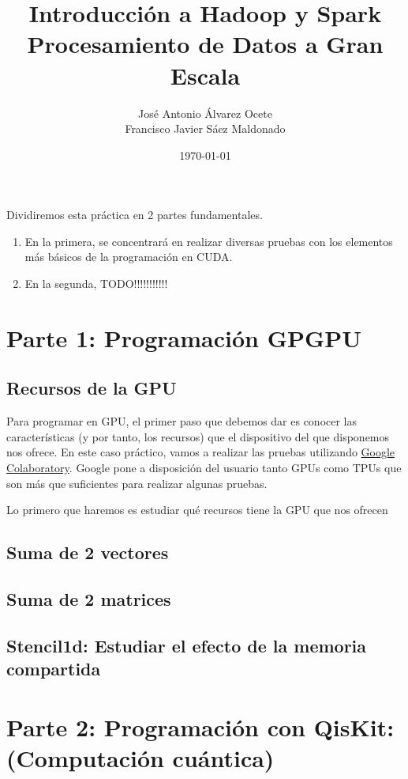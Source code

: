 \documentclass[11pt]{article}
\author{José Antonio Álvarez Ocete\\ Francisco Javier Sáez Maldonado}
\date{\today}
\title{Introducción a Hadoop y Spark\\\medskip
\rarge Procesamiento de Datos a Gran Escala}
\begin{document}
\maketitle

\tableofcontents

Dividiremos esta práctica en 2 partes fundamentales. 

\begin{enumerate}
	
	\item En la primera, se concentrará en realizar diversas pruebas con los elementos más básicos de la programación en CUDA.
	\item En la segunda, TODO!!!!!!!!!!!
\end{enumerate}

\section{Parte 1: Programación GPGPU}

\subsection{Recursos de la GPU}

Para programar en GPU, el primer paso que debemos dar es conocer las características (y por tanto, los recursos) que el dispositivo del que disponemos nos ofrece. En este caso práctico, vamos a realizar las pruebas utilizando \href{https://colab.research.google.com/}{Google Colaboratory}. Google pone a disposición del usuario tanto GPUs como TPUs que son más que suficientes para realizar algunas pruebas. 

Lo primero que haremos es estudiar qué recursos tiene la GPU que nos ofrecen
\subsection{Suma de 2 vectores}
\subsection{Suma de 2 matrices}
\subsection{Stencil1d: Estudiar el efecto de la memoria compartida}

\section{Parte 2: Programación con QisKit: (Computación cuántica)}
\end{document}
